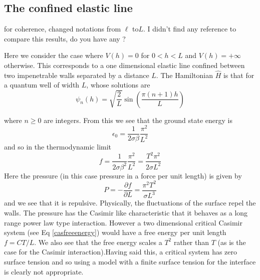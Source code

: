     \subsection{The confined elastic line}
    {\color{red} for coherence, changed notations from $\ell$ to$L$. I didn't find any reference to compare this results, do you have any ?}
    
    
Here we consider the case where $V(h)= 0$ for $0\less h \less L$ and $V(h)=+\infty$ otherwise. This corresponds to a one dimensional elastic line confined between two impenetrable walls separated by a distance $L$. The Hamiltonian $\hat H$ is that for a quantum well of width $L$, whose solutions are \cite{claude_cohen-tannoudji_mecanique_2018}
\begin{equation}
    \psi_n(h) = \sqrt{\frac{2}{L}}\sin\left(\frac{\pi(n+1)h}{L}\right)
\end{equation}

where $n\geq 0$ are integers. From this we see that {\color{red}the ground state energy is}
\begin{equation}
    \epsilon_0 = \frac{1}{2\sigma\beta}\frac{\pi^2}{L^2}
\end{equation}
and so {\color{red}in the thermodynamic limit}
\begin{equation}
    f = \frac{1}{2\sigma\beta^2}\frac{\pi^2}{L^2}= \frac{T^2\pi^2}{2\sigma L^2}
\end{equation}
Here the pressure (in this case pressure in a force per unit length) is given by
\begin{equation}
    P = -\frac{\partial f}{\partial L} = \frac{\pi^2 T^2}{\sigma L^3}
    \label{pfree}
\end{equation}
and we see that it is repulsive. Physically, the fluctuations of the surface repel the walls. 
The pressure has the Casimir like characteristic that it behaves as a long range power law type interaction. However a two dimensional critical Casimir system (see Eq \eqref{casfreeenergy}) would have a free energy per unit length $f=CT/L$. We also see that the free energy scales  a $T^2$ rather than $T$ (as is the case for the Casimir interaction).Having said this, a critical system has zero surface tension and so using a model with a finite
surface tension for the interface is clearly not appropriate.


